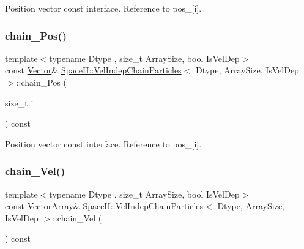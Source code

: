 Position vector const interface. Reference to pos\+\_\+\mbox{[}i\mbox{]}. 

\mbox{\label{class_space_h_1_1_vel_indep_chain_particles_a1d1f6b6ed5e916f84e6502d98773ed13}} 
\subsubsection{\texorpdfstring{chain_\+Pos()}{chainPos()}\hspace{0.1cm}{\footnotesize\ttfamily [4/4]}}
{\footnotesize\ttfamily template$<$typename Dtype , size\+\_\+t Array\+Size, bool Is\+Vel\+Dep$>$ \\
const \mbox{\hyperlink{class_space_h_1_1_vel_indep_particles_a61bbcfdb0dc7f99f3c68af69a755c935}{Vector}}\& \mbox{\hyperlink{class_space_h_1_1_vel_indep_chain_particles}{Space\+H\+::\+Vel\+Indep\+Chain\+Particles}}$<$ Dtype, Array\+Size, Is\+Vel\+Dep $>$\+::chain_\+Pos (\begin{DoxyParamCaption}\item[{size\+\_\+t}]{i }\end{DoxyParamCaption}) const\hspace{0.3cm}{\ttfamily [inline]}}



Position vector const interface. Reference to pos\+\_\+\mbox{[}i\mbox{]}. 

\mbox{\label{class_space_h_1_1_vel_indep_chain_particles_a741064afd96c861eac50e8de239eedaa}} 
\subsubsection{\texorpdfstring{chain_\+Vel()}{chainVel()}\hspace{0.1cm}{\footnotesize\ttfamily [1/4]}}
{\footnotesize\ttfamily template$<$typename Dtype , size\+\_\+t Array\+Size, bool Is\+Vel\+Dep$>$ \\
const \mbox{\hyperlink{class_space_h_1_1_vel_indep_particles_aa9983058940249df8b00fa800e8cbad2}{Vector\+Array}}\& \mbox{\hyperlink{class_space_h_1_1_vel_indep_chain_particles}{Space\+H\+::\+Vel\+Indep\+Chain\+Particles}}$<$ Dtype, Array\+Size, Is\+Vel\+Dep $>$\+::chain_\+Vel (\begin{DoxyParamCaption}{ }\end{DoxyParamCaption}) const\hspace{0.3cm}{\ttfamily [inline]}}



